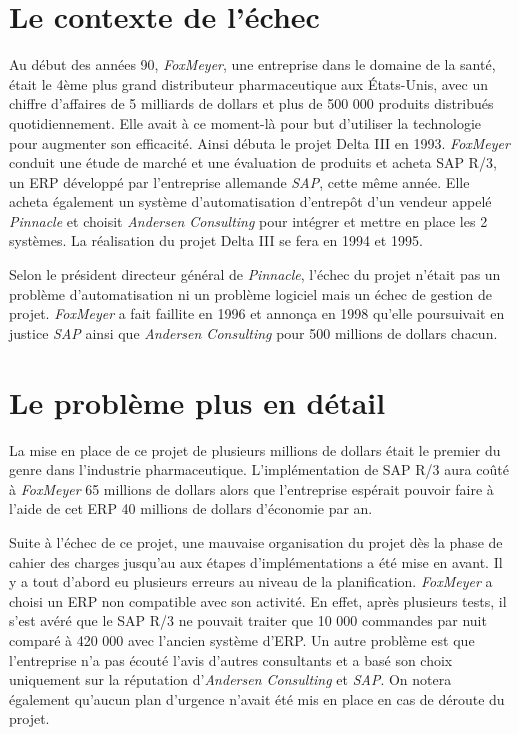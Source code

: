 \documentclass[12pt]{report}
\begin{document}
\section{Le contexte de l'échec}

Au début des années 90, \textit{FoxMeyer}, une entreprise dans le domaine de la santé, était le 4ème plus grand distributeur pharmaceutique aux États-Unis, avec un chiffre d’affaires de 5 milliards de dollars et plus de 500 000 produits distribués quotidiennement. Elle avait à ce moment-là pour but d’utiliser la technologie pour augmenter son efficacité. Ainsi débuta le projet Delta III en 1993.
\textit{FoxMeyer} conduit une étude de marché et une évaluation de produits et acheta SAP R/3, un ERP développé par l’entreprise allemande \textit{SAP}, cette même année.
Elle acheta également un système d’automatisation d’entrepôt d’un vendeur appelé \textit{Pinnacle} et choisit \textit{Andersen Consulting} pour intégrer et mettre en place les 2 systèmes. La réalisation du projet Delta III se fera en 1994 et 1995.

Selon le président directeur général de \textit{Pinnacle}, l’échec du projet n’était pas un problème d’automatisation ni un problème logiciel mais un échec de gestion de projet.
\textit{FoxMeyer} a fait faillite en 1996 et annonça en 1998 qu’elle poursuivait en justice \textit{SAP} ainsi que \textit{Andersen Consulting} pour 500 millions de dollars chacun.

\section{Le problème plus en détail}

La mise en place de ce projet de plusieurs millions de dollars était le premier du genre dans l’industrie pharmaceutique. L’implémentation de SAP R/3 aura coûté à \textit{FoxMeyer} 65 millions de dollars alors que l’entreprise espérait pouvoir faire à l’aide de cet ERP 40 millions de dollars d’économie par an.

Suite à l’échec de ce projet, une mauvaise organisation du projet dès la phase de cahier des charges jusqu’au aux étapes d’implémentations a été mise en avant.
Il y a tout d’abord eu plusieurs erreurs au niveau de la planification. \textit{FoxMeyer} a choisi un ERP non compatible avec son activité. En effet, après plusieurs tests, il s’est avéré que le SAP R/3 ne pouvait traiter que 10 000 commandes par nuit comparé à 420 000 avec l’ancien système d’ERP. Un autre problème est que l’entreprise n’a pas écouté l’avis d’autres consultants et a basé son choix uniquement sur la réputation d'\textit{Andersen Consulting} et \textit{SAP}. On notera également qu’aucun plan d’urgence n’avait été mis en place en cas de déroute du projet.
\end{document}
